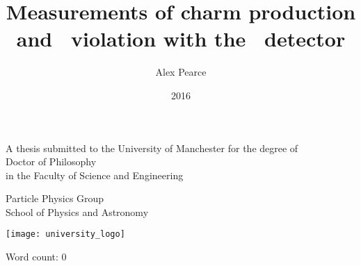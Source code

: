 \documentclass[a4paper,11pt]{memoir}
\author{Alex Pearce}
\title{%
  Measurements of charm production and
  \texorpdfstring{\CP}{CP}\ violation
  with the \lhcb\ detector
}
\date{2016}
\begin{document}
\begin{titlingpage}
  \begin{center}
    \textbf{\huge\thetitle}

    \vfill

    A thesis submitted to the University of Manchester for the degree of\\
    Doctor of Philosophy\\
    in the Faculty of Science and Engineering\\

    \vspace{0.8cm}

    \textbf{\thedate}

    \vfill

    \textbf{\theauthor}

    \vspace{0.8cm}

    Particle Physics Group\\
    School of Physics and Astronomy\\

    \vspace{0.8cm}

    \texttt{[image: university\_logo]}

    \iftoggle{draft}{%
      \vspace{0.8cm}
      \texttt{Draft generated on \today}
    }{}
  \end{center}
\end{titlingpage}

\frontmatter

\tableofcontents*

\vspace{1cm}
\noindent
Word count: 0

\cleardoublepage



\cleardoublepage



\cleardoublepage



\cleardoublepage



\cleardoublepage


\end{document}
